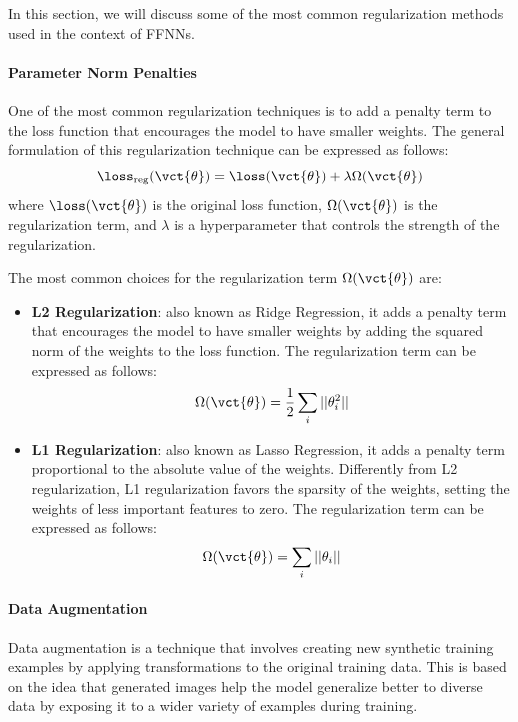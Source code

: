 In this section, we will discuss some of the most common regularization methods used in the context of FFNNs.

\paragraph{Parameter Norm Penalties}
One of the most common regularization techniques is to add a penalty term to the loss function that encourages the model to have smaller weights.
The general formulation of this regularization technique can be expressed as follows:
\begin{equation*}
    \loss_{\text{reg}}(\vct{\theta}) = \loss(\vct{\theta}) + \lambda \Omega(\vct{\theta})
\end{equation*}
where $\loss(\vct{\theta})$ is the original loss function, $\Omega(\vct{\theta})$ is the regularization term, and $\lambda$
is a hyperparameter that controls the strength of the regularization.

The most common choices for the regularization term $\Omega(\vct{\theta})$ are:
\begin{itemize}
    \item \textbf{L2 Regularization}: also known as Ridge Regression, it adds a penalty term that encourages the model to have smaller weights 
    by adding the squared norm of the weights to the loss function. The regularization term can be expressed as follows:
    \begin{equation*}
        \Omega(\vct{\theta}) = \frac{1}{2} \sum_{i} ||\theta_i^2||
    \end{equation*}
    \item \textbf{L1 Regularization}: also known as Lasso Regression, it adds a penalty term proportional to the absolute value of the weights.
    Differently from L2 regularization, L1 regularization favors the sparsity of the weights, setting the weights of less important features to zero. 
    The regularization term can be expressed as follows:
    \begin{equation*}
        \Omega(\vct{\theta}) = \sum_{i} ||\theta_i||
    \end{equation*}
\end{itemize}

\paragraph{Data Augmentation}
Data augmentation is a technique that involves creating new synthetic training examples by applying transformations to the original training data.
This is based on the idea that generated images help the model generalize better to diverse data by exposing it to a wider variety of examples during training.

